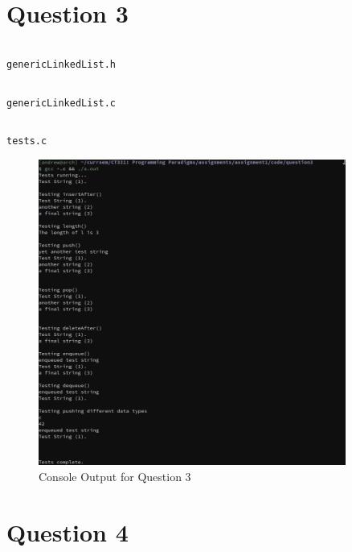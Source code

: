 \documentclass[a4paper]{article}
\newenvironment{code}{\captionsetup{type=listing, skip=0pt}}{}
\begin{document}
\section{Question 3}
\begin{code}
\inputminted[linenos, breaklines, frame=single]{C}{../code/question3/genericLinkedList.h}
\caption{\texttt{genericLinkedList.h}}
\end{code}

\begin{code}
\inputminted[linenos, breaklines, frame=single]{C}{../code/question3/genericLinkedList.c}
\caption{\texttt{genericLinkedList.c}}
\end{code}

\begin{code}
\inputminted[linenos, breaklines, frame=single]{C}{../code/question3/tests.c}
\caption{\texttt{tests.c}}
\end{code}

\begin{figure}[H]
    \centering
    \includegraphics[width=0.9\textwidth]{./images/question3.png}
    \caption{Console Output for Question 3}
\end{figure}

\section{Question 4}
\end{document}
